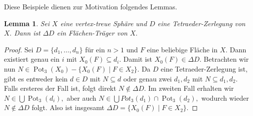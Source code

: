 \documentclass[12pt,titlepage,twoside,cleardoublepage]{article}
\theoremstyle{nummermitklammern}
\newtheorem{lemma}[temp]{Lemma}
\newtheorem{lemma}[zahl]{Lemma}
\numberwithin{equation}{section}
\DeclareMathOperator{\Pot}{Pot}
\begin{document}
Diese Beispiele dienen zur Motivation folgendes Lemmas.
\begin{lemma}
Sei $X$ eine vertex-treue Sphäre und $D$ eine Tetraeder-Zerlegung von $X.$ Dann ist $\Delta D$ ein Flächen-Träger von $X.$
\end{lemma}
\begin{proof}
Sei $D=\{d_1,\ldots,d_n\}$ für ein $n>1$
und $F$ eine beliebige Fläche in $X.$ Dann existiert genau ein $i$ mit $X_0(F)\subseteq d_i.$ Damit ist $X_0(F) \in \Delta D.$ Betrachten wir nun $N\in \Pot_3(X_0)-\{X_0(F)\mid F\in X_2\}.$ Da $D$ eine Tetraeder-Zerlegung ist, gibt es entweder kein $d\in D$ mit $N\subseteq d$ oder genau zwei $d_1,d_2$ mit $N\subseteq d_1,d_2.$ Falls ersteres der Fall ist, folgt direkt $N\notin \Delta D.$ Im zweiten Fall erhalten wir $N\in \bigcup \Pot_3(d_i),$ aber auch $N\in \bigcup Pot_3(d_1)\cap \Pot_3(d_2),$ wodurch wieder $N\notin \Delta D$ folgt. 
Also ist insgesamt $\Delta D=\{X_0(F)\mid F\in X_2\}.$ 
\end{proof}
\end{document}
